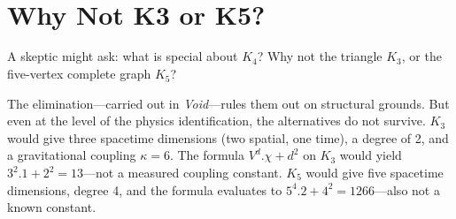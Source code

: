 \documentclass[11pt,a4paper]{book}
\def\cdot{.}%
\def\texorpdfstring#1#2{#2}%
\begin{document}
\begin{code}
\AgdaSymbol{=}\AgdaSpace{}%
\AgdaSpace{}%
\AgdaOperator{\AgdaPrimitive{*}}\AgdaSpace{}%
\AgdaSpace{}%
\AgdaOperator{\AgdaPrimitive{*}}\AgdaSpace{}%
%
\>[77]\<%
\\
%
\\[\AgdaEmptyExtraSkip]%
\>[0]\AgdaSpace{}%
\AgdaSymbol{:}\AgdaSpace{}%
\<%
\\
\>[0]\AgdaSpace{}%
\AgdaSymbol{=}\AgdaSpace{}%
\AgdaSpace{}%
\AgdaOperator{\AgdaPrimitive{*}}\AgdaSpace{}%
%
\>[47]\<%
\\
%
\\[\AgdaEmptyExtraSkip]%
\>[0]\AgdaSpace{}%
\AgdaSymbol{:}\AgdaSpace{}%
\<%
\\
\>[0]\AgdaSpace{}%
\AgdaSymbol{=}\AgdaSpace{}%
\AgdaSymbol{(}\AgdaSpace{}%
\AgdaOperator{\AgdaPrimitive{*}}\AgdaSpace{}%
\AgdaSymbol{)}\AgdaSpace{}%
\AgdaOperator{\AgdaPrimitive{+}}\AgdaSpace{}%
\<%
\\
%
\\[\AgdaEmptyExtraSkip]%
\>[0]\AgdaSpace{}%
\AgdaSymbol{:}\AgdaSpace{}%
\<%
\\
\>[0]\AgdaSpace{}%
\AgdaSymbol{=}\AgdaSpace{}%
\<%
\end{code}

\section{Why Not K\texorpdfstring{$_3$}{3} or K\texorpdfstring{$_5$}{5}?}

A skeptic might ask: what is special about $K_4$? Why not the triangle $K_3$, or the five-vertex complete graph $K_5$?

The elimination---carried out in \textit{Void}---rules them out on structural grounds. But even at the level of the physics identification, the alternatives do not survive. $K_3$ would give three spacetime dimensions (two spatial, one time), a degree of 2, and a gravitational coupling $\kappa = 6$. The formula $V^d \cdot \chi + d^2$ on $K_3$ would yield $3^2 \cdot 1 + 2^2 = 13$---not a measured coupling constant. $K_5$ would give five spacetime dimensions, degree 4, and the formula evaluates to $5^4 \cdot 2 + 4^2 = 1266$---also not a known constant.
\end{document}
